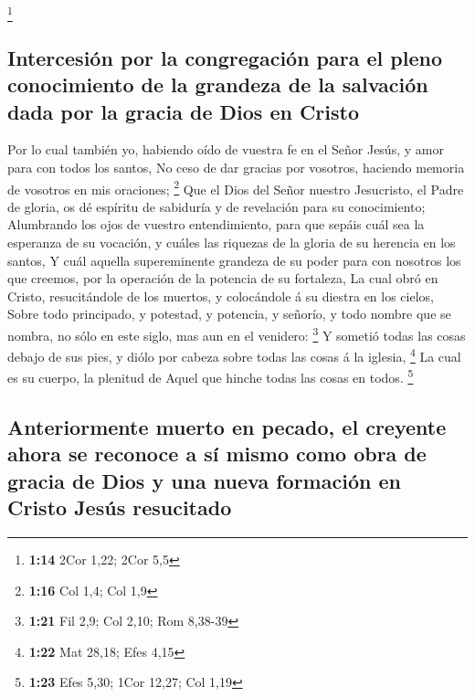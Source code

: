 \footnote{\textbf{1:14} 2Cor 1,22; 2Cor 5,5}

\hypertarget{intercesiuxf3n-por-la-congregaciuxf3n-para-el-pleno-conocimiento-de-la-grandeza-de-la-salvaciuxf3n-dada-por-la-gracia-de-dios-en-cristo}{%
\subsection{Intercesión por la congregación para el pleno conocimiento
de la grandeza de la salvación dada por la gracia de Dios en
Cristo}\label{intercesiuxf3n-por-la-congregaciuxf3n-para-el-pleno-conocimiento-de-la-grandeza-de-la-salvaciuxf3n-dada-por-la-gracia-de-dios-en-cristo}}

 Por lo cual también yo, habiendo oído de vuestra fe en el
Señor Jesús, y amor para con todos los santos,  No ceso de
dar gracias por vosotros, haciendo memoria de vosotros en mis oraciones;
\footnote{\textbf{1:16} Col 1,4; Col 1,9}  Que el Dios del
Señor nuestro Jesucristo, el Padre de gloria, os dé espíritu de
sabiduría y de revelación para su conocimiento;  Alumbrando
los ojos de vuestro entendimiento, para que sepáis cuál sea la esperanza
de su vocación, y cuáles las riquezas de la gloria de su herencia en los
santos,  Y cuál aquella supereminente grandeza de su poder
para con nosotros los que creemos, por la operación de la potencia de su
fortaleza,  La cual obró en Cristo, resucitándole de los
muertos, y colocándole á su diestra en los cielos,  Sobre
todo principado, y potestad, y potencia, y señorío, y todo nombre que se
nombra, no sólo en este siglo, mas aun en el venidero: \footnote{\textbf{1:21}
  Fil 2,9; Col 2,10; Rom 8,38-39}  Y sometió todas las
cosas debajo de sus pies, y diólo por cabeza sobre todas las cosas á la
iglesia, \footnote{\textbf{1:22} Mat 28,18; Efes 4,15}  La
cual es su cuerpo, la plenitud de Aquel que hinche todas las cosas en
todos. \footnote{\textbf{1:23} Efes 5,30; 1Cor 12,27; Col 1,19}

\hypertarget{anteriormente-muerto-en-pecado-el-creyente-ahora-se-reconoce-a-suxed-mismo-como-obra-de-gracia-de-dios-y-una-nueva-formaciuxf3n-en-cristo-jesuxfas-resucitado}{%
\subsection{Anteriormente muerto en pecado, el creyente ahora se
reconoce a sí mismo como obra de gracia de Dios y una nueva formación en
Cristo Jesús
resucitado}\label{anteriormente-muerto-en-pecado-el-creyente-ahora-se-reconoce-a-suxed-mismo-como-obra-de-gracia-de-dios-y-una-nueva-formaciuxf3n-en-cristo-jesuxfas-resucitado}}

